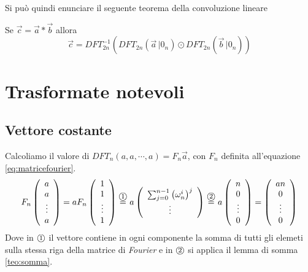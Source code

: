 Si può quindi enunciare il seguente teorema della convoluzione lineare

\begin{theorem}
    Se $\vec{c} = \vec{a} * \vec{b}$ allora
    \begin{equation*}
        \vec{c} = DFT_{2n}^{-1} \left( 
            DFT_{2n} \left( \vec{a} \, | 0_n \right)
            \odot
            DFT_{2n} \left( \vec{b} \, | 0_n \right)
        \right)
    \end{equation*}
    \label{teo:convlin}
\end{theorem}

\section{Trasformate notevoli}

\subsection{Vettore costante}
Calcoliamo il valore di $DFT_n \left( a, a, \cdots, a \right) = F_n \vec{a}$, con $F_n$ definita all'equazione \ref{eq:matricefourier}.
\begin{equation*}
    F_n
    \left( 
        \begin{array}[h]{c}
            a \\ a \\ \vdots \\ a
        \end{array}
    \right)
    =
    a F_n
    \left( 
        \begin{array}[h]{c}
            1 \\ 1 \\ \vdots \\ 1
        \end{array}
    \right)
    \overset{\circola{1}}{=}
    a
    \left( 
        \begin{array}[h]{c}
            \sum_{j=0}^{n-1} \left( \omega_n^i \right)^j  \\
            \vdots
        \end{array}
    \right)
    \overset{\circola{2}}{=}
    a
    \left( 
        \begin{array}[h]{c}
            n \\ 0 \\ \vdots \\ 0
        \end{array}
    \right)
    =
    \left( 
        \begin{array}[h]{c}
            an \\ 0 \\ \vdots \\ 0
        \end{array}
    \right)
\end{equation*}
Dove in $\mbox{\textcircled{\footnotesize 1}}$ il vettore contiene in ogni componente la somma di tutti gli elemeti sulla stessa riga della matrice di \textit{Fourier} e in $\mbox{\textcircled{\footnotesize 2}}$ si applica il lemma di somma \ref{teo:somma}.

